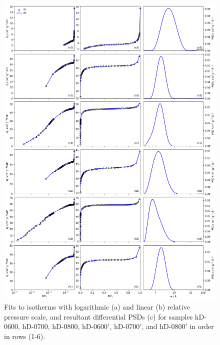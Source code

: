 \begin{figure}[p]
    \centering
    \includegraphics[width=\columnwidth, keepaspectratio]{4-cbs/figs/CB-0TTT_isopsd.png}
    \caption{Fits to  isotherms with logarithmic (a) and linear (b) relative pressure scale, and resultant differential PSDs (c) for samples hD-0600, hD-0700, hD-0800, hD-0600$'$, hD-0700$'$, and hD-0800$'$ in order in rows (1-6).}
    \label{fig:0TTT_psdisofull}
\end{figure}


